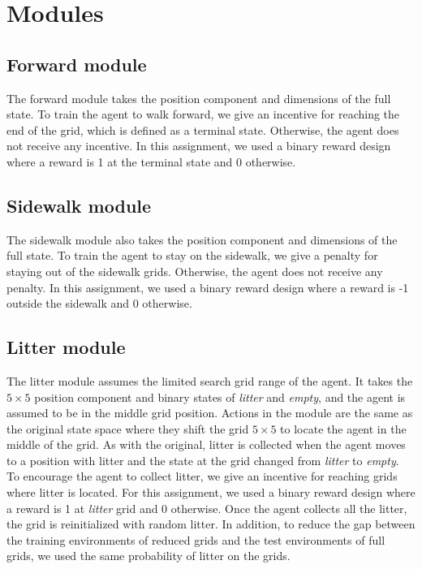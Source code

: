 \documentclass[conference]{IEEEtran}
\begin{document}
\section{Modules}
\label{sec:method}

\subsection{Forward module}
The forward module takes the position component and dimensions of the full state.
To train the agent to walk forward, we give an incentive for reaching the end of the grid, which is defined as a terminal state.
Otherwise, the agent does not receive any incentive.
In this assignment, we used a binary reward design where a reward is 1 at the terminal state and 0 otherwise.

\subsection{Sidewalk module}
The sidewalk module also takes the position component and dimensions of the full state.
To train the agent to stay on the sidewalk, we give a penalty for staying out of the sidewalk grids.
Otherwise, the agent does not receive any penalty.
In this assignment, we used a binary reward design where a reward is -1 outside the sidewalk and 0 otherwise.

\subsection{Litter module}
The litter module assumes the limited search grid range of the agent.
It takes the $5 \times 5$ position component and binary states of {\it litter} and {\it empty}, and the agent is assumed to be in the middle grid position.
Actions in the module are the same as the original state space where they shift the grid $5 \times 5$ to locate the agent in the middle of the grid.
As with the original, litter is collected when the agent moves to a position with litter and the state at the grid changed from {\it litter} to {\it empty}.
To encourage the agent to collect litter, we give an incentive for reaching grids where litter is located.
For this assignment, we used a binary reward design where a reward is 1 at {\it litter} grid and 0 otherwise.
Once the agent collects all the litter, the grid is reinitialized with random litter.
In addition, to reduce the gap between the training environments of reduced grids and the test environments of full grids, we used the same probability of litter on the grids.
\end{document}

